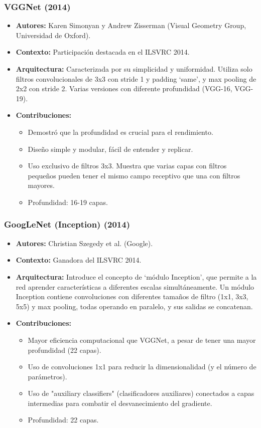 \documentclass{article}
\begin{document}
\subsubsection{VGGNet (2014)}

\begin{itemize}
    \item \textbf{Autores:} Karen Simonyan y Andrew Zisserman (Visual Geometry Group, Universidad de Oxford).
    \item \textbf{Contexto:}  Participación destacada en el ILSVRC 2014.
    \item \textbf{Arquitectura:}  Caracterizada por su simplicidad y uniformidad.  Utiliza solo filtros convolucionales de 3x3 con stride 1 y padding `same', y max pooling de 2x2 con stride 2.  Varias versiones con diferente profundidad (VGG-16, VGG-19).
    \item \textbf{Contribuciones:}
    \begin{itemize}
        \item Demostró que la profundidad es crucial para el rendimiento.
        \item Diseño simple y modular, fácil de entender y replicar.
        \item Uso exclusivo de filtros 3x3. Muestra que varias capas con filtros pequeños pueden tener el mismo campo receptivo que una con filtros mayores.
        \item Profundidad: 16-19 capas.
    \end{itemize}
\end{itemize}

\subsubsection{GoogLeNet (Inception) (2014)}

\begin{itemize}
    \item \textbf{Autores:}  Christian Szegedy et al. (Google).
    \item \textbf{Contexto:}  Ganadora del ILSVRC 2014.
    \item \textbf{Arquitectura:}  Introduce el concepto de `módulo Inception', que permite a la red aprender características a diferentes escalas simultáneamente.  Un módulo Inception contiene convoluciones con diferentes tamaños de filtro (1x1, 3x3, 5x5) y max pooling, todas operando en paralelo, y sus salidas se concatenan.
    \item \textbf{Contribuciones:}
    \begin{itemize}
        \item Mayor eficiencia computacional que VGGNet, a pesar de tener una mayor profundidad (22 capas).
        \item Uso de convoluciones 1x1 para reducir la dimensionalidad (y el número de parámetros).
        \item Uso de "auxiliary classifiers" (clasificadores auxiliares) conectados a capas intermedias para combatir el desvanecimiento del gradiente.
        \item Profundidad: 22 capas.
    \end{itemize}
\end{itemize}
\end{document}

